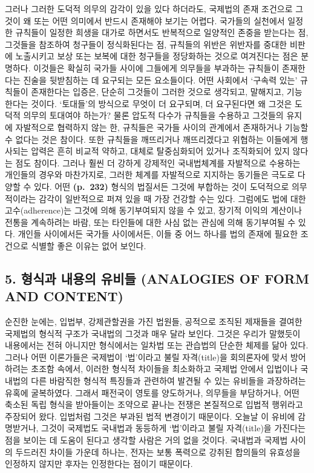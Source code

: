 그러나 그러한 도덕적 의무의 감각이 있을  있다 하더라도,
국제법의 존재 조건으로 그것이 왜 또는 어떤 의미에서 반드시 존재해야
 보기는 어렵다. 국가들의 실천에서 일정한 규칙들이 일정한
희생을 대가로 하면서도 반복적으로 일양적인 존중을 받는다는 점, 그것들을
참조하여 청구들이 정식화된다는 점, 규칙들의 위반은 위반자를 중대한
비판에 노출시키고 보상 또는 보복에 대한 청구들을 정당화하는 것으로
여겨진다는 점은 분명하다. 이것들은 확실히 국가들 사이에 그들에게
의무들을 부과하는 규칙들이 존재한다는 진술을 뒷받침하는 데 요구되는 모든
요소들이다. 어떤 사회에서 ‘구속력 있는’ 규칙들이 존재한다는 입증은,
단순히 그것들이 그러한 것으로 생각되고, 말해지고, 기능한다는 것이다.
‘토대들’의 방식으로 무엇이 더 요구되며, 더 요구된다면 왜 그것은 도덕적
의무의 토대여야 하는가? 물론 압도적 다수가 규칙들을 수용하고 그것들의
유지에 자발적으로 협력하지 않는 한, 규칙들은 국가들 사이의 관계에서
존재하거나 기능할 수 없다는 것은 참이다. 또한 규칙들을 깨뜨리거나
깨뜨리겠다고 위협하는 이들에게 행사되는 압력은 흔히 비교적 약하고,
대체로 탈중심화되어 있거나 조직화되어 있지 않다는 점도 참이다. 그러나
훨씬 더 강하게 강제적인 국내법체계를 자발적으로 수용하는 개인들의 경우와
마찬가지로, 그러한 체계를 자발적으로 지지하는 동기들은 극도로 다양할 수
있다. 어떤 \textbf{(p.~232)} 형식의 법질서든 그것에 부합하는 것이
도덕적으로 의무적이라는 감각이 일반적으로 퍼져 있을 때 가장 건강할 수는
있다. 그럼에도 법에 대한 고수(adherence)는 그것에 의해 동기부여되지 않을
수 있고, 장기적 이익의 계산이나 전통을 계속하려는 바람, 또는 타인들에
대한 사심 없는 관심에 의해 동기부여될 수 있다. 개인들 사이에서든 국가들
사이에서든, 이들 중 어느 하나를 법의 존재에 필요한 조건으로 식별할 좋은
이유는 없어 보인다.

\subsection{5. 형식과 내용의 유비들 (ANALOGIES OF FORM AND
CONTENT)}\label{uxd615uxc2dduxacfc-uxb0b4uxc6a9uxc758-uxc720uxbe44uxb4e4-analogies-of-form-and-content}

순진한 눈에는, 입법부, 강제관할권을 가진 법원들, 공적으로 조직된
제재들을 결여한 국제법의 형식적 구조가 국내법의 그것과 매우 달라 보인다.
그것은 우리가 말했듯이 내용에서는 전혀 아니지만 형식에서는 일차법 또는
관습법의 단순한 체제를 닮아 있다. 그러나 어떤 이론가들은 국제법이
‘법’이라고 불릴 자격(title)을 회의론자에 맞서 방어하려는 초조함 속에서,
이러한 형식적 차이들을 최소화하고 국제법 안에서 입법이나 국내법의 다른
바람직한 형식적 특징들과 관련하여 발견될 수 있는 유비들을 과장하려는
유혹에 굴복하였다. 그래서 패전국이 영토를 양도하거나, 의무들을
부담하거나, 어떤 축소된 독립 형식을 받아들이는 조약으로 끝나는 전쟁은
본질적으로 입법적 행위라고 주장되어 왔다. 입법처럼 그것은 부과된 법적
변경이기 때문이다. 오늘날 이 유비에 감명받거나, 그것이 국제법도 국내법과
동등하게 ‘법’이라고 불릴 자격(title)을 가진다는 점을 보이는 데 도움이
된다고 생각할 사람은 거의 없을 것이다. 국내법과 국제법 사이의 두드러진
차이들 가운데 하나는, 전자는 보통 폭력으로 강취된 합의들의 유효성을
인정하지 않지만 후자는 인정한다는 점이기 때문이다.

